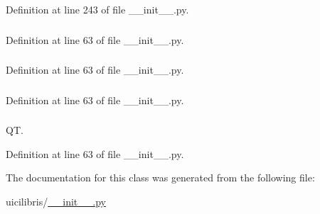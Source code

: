 \-Definition at line 243 of file \-\_\-\-\_\-init\-\_\-\-\_\-.\-py.

\hypertarget{classuicilibris_1_1w2mMainWindow_a73782bac2df26e751c3708d1d4bf91ea}{
\subsubsection[{ui}]{}}\label{classuicilibris_1_1w2mMainWindow_a73782bac2df26e751c3708d1d4bf91ea}


\-Definition at line 63 of file \-\_\-\-\_\-init\-\_\-\-\_\-.\-py.

\hypertarget{classuicilibris_1_1w2mMainWindow_a68829ffe68e143cc8b97935532cf61ba}{
\subsubsection[{wb}]{}}\label{classuicilibris_1_1w2mMainWindow_a68829ffe68e143cc8b97935532cf61ba}


\-Definition at line 63 of file \-\_\-\-\_\-init\-\_\-\-\_\-.\-py.

\hypertarget{classuicilibris_1_1w2mMainWindow_a33b1085f838c6856e90a6c84913bf524}{
\subsubsection[{wiki\-Index}]{}}\label{classuicilibris_1_1w2mMainWindow_a33b1085f838c6856e90a6c84913bf524}


\-Definition at line 63 of file \-\_\-\-\_\-init\-\_\-\-\_\-.\-py.

\hypertarget{classuicilibris_1_1w2mMainWindow_a7ba2f6374f9d3d52acf7f99f8eac18d1}{
\subsubsection[{window\-Title}]{}}\label{classuicilibris_1_1w2mMainWindow_a7ba2f6374f9d3d52acf7f99f8eac18d1}


\-Q\-T. 



\-Definition at line 63 of file \-\_\-\-\_\-init\-\_\-\-\_\-.\-py.



\-The documentation for this class was generated from the following file\-:\begin{DoxyCompactItemize}
\item 
uicilibris/\hyperlink{____init_____8py}{\-\_\-\-\_\-init\-\_\-\-\_\-.\-py}\end{DoxyCompactItemize}
